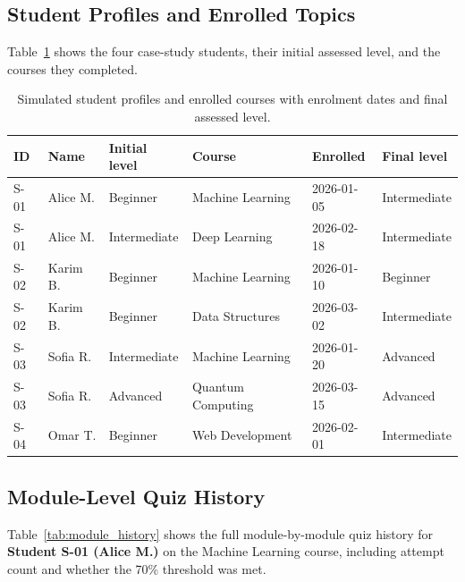 \documentclass[12pt,a4paper]{article}
\begin{document}
\subsection{Student Profiles and Enrolled Topics}

Table~\ref{tab:student_courses} shows the four case-study students, their
initial assessed level, and the courses they completed.

\begin{table}[H]
  \centering
  \caption{Simulated student profiles and enrolled courses with enrolment dates
  and final assessed level.}
  \label{tab:student_courses}
  \begin{tabularx}{\textwidth}{@{}llllll@{}}
    \toprule
    \textbf{ID} & \textbf{Name} & \textbf{Initial level} & \textbf{Course} & \textbf{Enrolled} & \textbf{Final level} \\
    \midrule
    S-01 & Alice M.   & Beginner     & Machine Learning  & 2026-01-05 & Intermediate \\
    S-01 & Alice M.   & Intermediate & Deep Learning     & 2026-02-18 & Intermediate \\
    S-02 & Karim B.   & Beginner     & Machine Learning  & 2026-01-10 & Beginner     \\
    S-02 & Karim B.   & Beginner     & Data Structures   & 2026-03-02 & Intermediate \\
    S-03 & Sofia R.   & Intermediate & Machine Learning  & 2026-01-20 & Advanced     \\
    S-03 & Sofia R.   & Advanced     & Quantum Computing & 2026-03-15 & Advanced     \\
    S-04 & Omar T.    & Beginner     & Web Development   & 2026-02-01 & Intermediate \\
    \bottomrule
  \end{tabularx}
\end{table}

\subsection{Module-Level Quiz History}

Table~\ref{tab:module_history} shows the full module-by-module quiz history
for \textbf{Student S-01 (Alice M.)} on the Machine Learning course,
including attempt count and whether the 70\% threshold was met.
\end{document}
